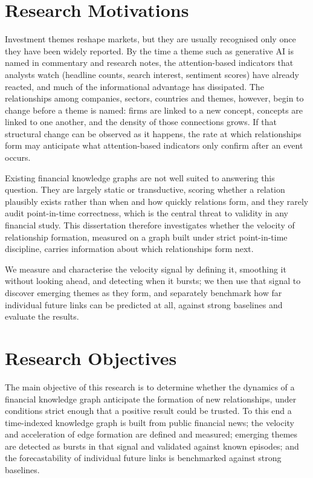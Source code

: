 \documentclass[a4paper,12pt]{report}
\begin{document}
\section{Research Motivations}
Investment themes reshape markets, but they are usually recognised only once
they have been widely reported. By the time a theme such as generative AI is named in commentary and research notes, the
attention-based indicators that analysts watch (headline counts, search
interest, sentiment scores) have already reacted, and much of the
informational advantage has dissipated. The relationships among companies,
sectors, countries and themes, however, begin to change before a theme is
named: firms are linked to a new concept, concepts are linked to one another,
and the density of those connections grows. If that structural change can be
observed as it happens, the rate at which relationships form may
anticipate what attention-based indicators only confirm after an event occurs.

Existing financial knowledge graphs are not well suited to answering this
question. They are largely static or transductive, scoring whether a relation
plausibly exists rather than when and how quickly relations form, and they
rarely audit point-in-time correctness, which is the central threat to validity
in any financial study. This dissertation therefore investigates whether
the velocity of relationship formation, measured on a graph built under
strict point-in-time discipline, carries information about which relationships
form next.

We measure and characterise the velocity signal by defining it, smoothing it
without looking ahead, and detecting when it bursts; we then use that signal to
discover emerging themes as they form, and separately benchmark how far
individual future links can be predicted at all, against strong baselines and
evaluate the results.

\section{Research Objectives}
\label{sec:objectives}
The main objective of this research is to determine whether the dynamics of a
financial knowledge graph anticipate the formation of new relationships, under
conditions strict enough that a positive result could be trusted. To this end a
time-indexed knowledge graph is built from public financial news; the velocity
and acceleration of edge formation are defined and measured; emerging themes are
detected as bursts in that signal and validated against known episodes; and the
forecastability of individual future links is benchmarked against strong
baselines.
\end{document}
